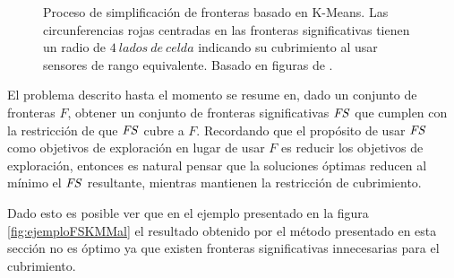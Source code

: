 \begin{figure}[H]
  \caption[Proceso de simplificación de fronteras basado en K-Means.]{Proceso de
    simplificación de fronteras basado en K-Means. Las circunferencias rojas
    centradas en las fronteras significativas tienen un radio de $4\ lados\ de\ celda$ indicando su cubrimiento
    al usar sensores de rango equivalente. Basado en figuras de \cite{Amorin2019}.}\label{fig:ejemploFrontSig}
\end{figure}


El problema descrito hasta el momento se resume en, dado un conjunto de
fronteras $F$, obtener un conjunto de fronteras significativas $\mathit{FS}$ que
cumplen con la restricción de que $\mathit{FS}$ cubre a $F$. Recordando que el
propósito de usar $\mathit{FS}$ como objetivos de exploración en lugar de usar $F$
es reducir los objetivos de exploración, entonces es natural pensar que la
soluciones óptimas reducen al mínimo el $\mathit{FS}$ resultante, mientras
mantienen la restricción de cubrimiento.


Dado esto es posible ver que en el ejemplo presentado en la figura
\ref{fig:ejemploFSKMMal} el resultado obtenido por el método presentado en esta
sección no es óptimo ya que existen fronteras significativas innecesarias para
el cubrimiento. 

